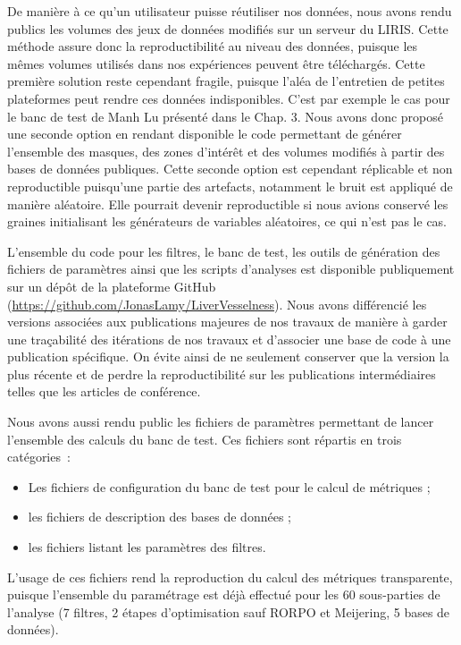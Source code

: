 De manière à ce qu'un utilisateur puisse réutiliser nos données, nous avons rendu publics les volumes des jeux de données modifiés sur un serveur du LIRIS. Cette méthode assure donc la reproductibilité au niveau des données, puisque les mêmes volumes utilisés dans nos expériences peuvent être téléchargés. Cette première solution reste cependant fragile, puisque l'aléa de l'entretien de petites plateformes peut rendre ces données indisponibles. C'est par exemple le cas pour le banc de test de Manh Lu présenté dans le Chap. 3. Nous avons donc proposé une seconde option en rendant disponible le code permettant de générer l'ensemble des masques, des zones d'intérêt et des volumes modifiés à partir des bases de données publiques. Cette seconde option est cependant réplicable et non reproductible puisqu'une partie des artefacts, notamment le bruit est appliqué de manière aléatoire. Elle pourrait devenir reproductible si nous avions conservé les graines initialisant les générateurs de variables aléatoires, ce qui n'est pas le cas.  

L'ensemble du code pour les filtres, le banc de test, les outils de génération des fichiers de paramètres ainsi que les scripts d'analyses est disponible publiquement sur un dépôt de la plateforme GitHub (\url{https://github.com/JonasLamy/LiverVesselness}). Nous avons différencié les versions associées aux publications majeures de nos travaux de manière à garder une traçabilité des itérations de nos travaux et d'associer une base de code à une publication spécifique. On évite ainsi de ne seulement conserver que la version la plus récente et de perdre la reproductibilité sur les publications intermédiaires telles que les articles de conférence.

Nous avons aussi rendu public les fichiers de paramètres permettant de lancer l'ensemble des calculs du banc de test. Ces fichiers sont répartis en trois catégories~: 

\begin{itemize}
\item Les fichiers de configuration du banc de test pour le calcul de métriques ;
\item les fichiers de description des bases de données ;
\item les fichiers listant les paramètres des filtres.  
\end{itemize}

L'usage de ces fichiers rend la reproduction du calcul des métriques transparente, puisque l'ensemble du paramétrage est déjà effectué pour les 60 sous-parties de l'analyse (7 filtres, 2 étapes d'optimisation sauf RORPO et Meijering, 5 bases de données).

